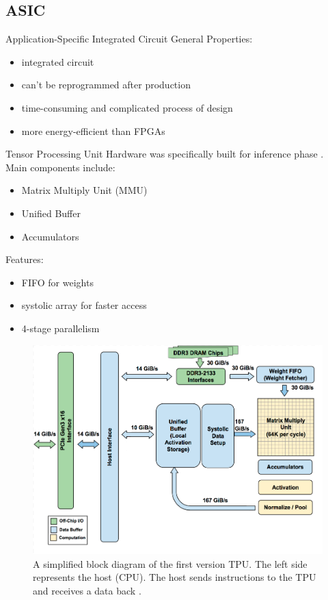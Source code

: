 \documentclass[en]{sdqbeamer}
\begin{document}
	
	\subsection{ASIC}
	\begin{frame}{Application-Specific Integrated Circuit}
		General Properties:
		\begin{itemize}
			\item integrated circuit
			\item can't be reprogrammed after production
			\item time-consuming and complicated process of design
			\item more energy-efficient than FPGAs
		\end{itemize}
	\end{frame}
	
	\begin{frame}{Tensor Processing Unit}
		Hardware was specifically built for inference phase \cite{jouppi2017datacenter}.\\
		Main components include:
		\begin{itemize}
			\item Matrix Multiply Unit (MMU)
			\item Unified Buffer
			\item Accumulators
		\end{itemize}
		Features:
		\begin{itemize}
			\item FIFO for weights
			\item systolic array for faster access
			\item 4-stage parallelism
		\end{itemize}
	\end{frame}
	
	\begin{frame}
		\begin{figure}
			\centering
			\includegraphics[width= 0.5\paperwidth]{pictures/tpu_floorplan.png}
			\caption{A simplified block diagram of the first version TPU. The left side represents the host (CPU). The host sends instructions to the TPU and receives a data back \cite{jouppi2017datacenter}.}
		\end{figure}
	\end{frame}
	
\end{document}
